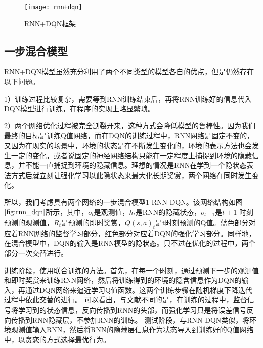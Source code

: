 \begin{figure}[htbp]
\centering
\texttt{[image: rnn+dqn]}
\caption{RNN+DQN框架}
\label{fig:rnn+dqn}
\end{figure}

\subsection{一步混合模型}

RNN+DQN模型虽然充分利用了两个不同类型的模型各自的优点，但是仍然存在以下问题。

1）训练过程比较复杂，需要等到RNN训练结束后，再将RNN训练好的信息代入DQN模型进行训练，在程序的实现上略显繁琐。

2）两个网络优化过程被完全割裂开来，这种方式会降低模型的鲁棒性。因为我们最终的目标是训练Q值网络，而在DQN的训练过程中，RNN网络是固定不变的，又因为在现实的场景中，环境的状态是在不断发生变化的，环境的表示方法也会发生一定的变化，或者说固定的神经网络结构只能在一定程度上捕捉到环境的隐藏信息，并不能一直捕捉到环境的隐藏信息。理想的情况是RNN在学到一个隐状态表法方式后就立刻让强化学习以此隐状态来最大化长期奖赏，两个网络在同时发生变化。


所以，我们考虑具有两个网络的一步混合模型1-RNN-DQN。该网络结构如图$\ref{fig:rnn_dqn}$所示，其中，$o_{t}$是观测值，$h_{t}$是RNN的隐藏状态，$o_{t+1}^{'}$是$t+1$ 时刻预测的观测值，$R_{t}$是预测的即时奖赏，$Q(s,a)_{t}$是t时刻预测的Q值。蓝色部分对应着RNN网络的监督学习部分，红色部分对应着DQN的强化学习部分。同样地，在混合模型中，DQN的输入是RNN模型的隐状态。只不过在优化的过程中，两个部分一次交替进行。

训练阶段，使用联合训练的方法。首先，在每一个时刻，通过预测下一步的观测值和即时奖赏来训练RNN网络，然后将训练得到的环境的隐含信息作为DQN的输入，再通过DQN网络来逼近学习Q值函数。这两个训练步骤在随机梯度下降迭代过程中依此交替的进行。
可以看出，与文献\citep{hausknecht2015deep,narasimhan2015language}不同的是，在训练的过程中，监督信号将学习到的状态信息，反向传播到RNN的头部，而强化学习只是将误差信号反向传播到RNN隐藏层，不参加RNN的训练。
测试阶段，与RNN-DQN类似，将环境观测值输入RNN，然后将RNN的隐藏层信息作为状态导入到训练好的Q值网络中，以贪恋的方式选择最优行为。

